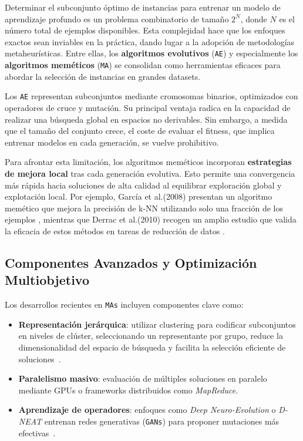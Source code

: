 Determinar el subconjunto óptimo de instancias para entrenar un modelo de aprendizaje profundo es un problema combinatorio de tamaño $2^N$, donde $N$ es el número total de ejemplos disponibles.
Esta complejidad hace que los enfoques exactos sean inviables en la práctica, dando lugar a la adopción de metodologías metaheurísticas.
Entre ellas, los \textbf{algoritmos evolutivos} (\texttt{AE}) y especialmente los \textbf{algoritmos meméticos} (\texttt{MA}) se consolidan como herramientas eficaces para abordar la selección de instancias en grandes datasets.

Los \texttt{AE} representan subconjuntos mediante cromosomas binarios, optimizados con operadores de cruce y mutación.
Su principal ventaja radica en la capacidad de realizar una búsqueda global en espacios no derivables.
Sin embargo, a medida que el tamaño del conjunto crece, el coste de evaluar el fitness, que implica entrenar modelos en cada generación, se vuelve prohibitivo.

Para afrontar esta limitación, los algoritmos meméticos incorporan \textbf{estrategias de mejora local} tras cada generación evolutiva.
Esto permite una convergencia más rápida hacia soluciones de alta calidad al equilibrar exploración global y explotación local.
Por ejemplo, García et al.(2008) presentan un algoritmo memético que mejora la precisión de k-NN utilizando solo una fracción de los ejemplos \cite{garciaMemeticAlgorithmEvolutionary2008}, mientras que Derrac et al.(2010) recogen un amplio estudio que valida la eficacia de estos métodos en tareas de reducción de datos \cite{derracSurveyEvolutionaryInstance2012}.

\subsection{Componentes Avanzados y Optimización Multiobjetivo}

Los desarrollos recientes en \texttt{MAs} incluyen componentes clave como:

\begin{itemize}
      \item \textbf{Representación jerárquica}: utilizar clustering para codificar subconjuntos en niveles de clúster, seleccionando un representante por grupo, reduce la dimensionalidad del espacio de búsqueda y facilita la selección eficiente de soluciones~\cite{chenClusteringBasedSubsetSelection2021}.
      \item \textbf{Paralelismo masivo}: evaluación de múltiples soluciones en paralelo mediante GPUs o frameworks distribuidos como \textit{MapReduce}.
      \item \textbf{Aprendizaje de operadores}: enfoques como \textit{Deep Neuro-Evolution} o \textit{D-NEAT} entrenan redes generativas (\texttt{GANs}) para proponer mutaciones más efectivas~\cite{realRegularizedEvolutionImage2019}.
\end{itemize}

